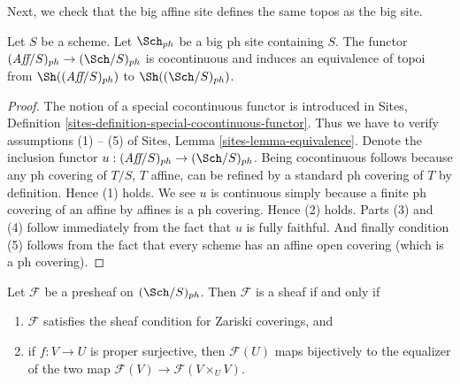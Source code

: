 \noindent
Next, we check that the big affine site defines the same
topos as the big site.

\begin{lemma}
\label{lemma-affine-big-site-ph}
Let $S$ be a scheme. Let $\Sch_{ph}$ be a big ph
site containing $S$.
The functor $(\textit{Aff}/S)_{ph} \to (\Sch/S)_{ph}$
is cocontinuous and induces an equivalence of topoi from
$\Sh((\textit{Aff}/S)_{ph})$ to
$\Sh((\Sch/S)_{ph})$.
\end{lemma}

\begin{proof}
The notion of a special cocontinuous functor is introduced in
Sites, Definition \ref{sites-definition-special-cocontinuous-functor}.
Thus we have to verify assumptions (1) -- (5) of
Sites, Lemma \ref{sites-lemma-equivalence}.
Denote the inclusion functor
$u : (\textit{Aff}/S)_{ph} \to (\Sch/S)_{ph}$.
Being cocontinuous follows because any ph covering of
$T/S$, $T$ affine, can be refined by a standard ph covering of $T$
by definition. Hence (1) holds. We see $u$ is continuous simply
because a finite ph covering of an affine by affines is a ph covering.
Hence (2) holds.
Parts (3) and (4) follow immediately from the fact that $u$ is
fully faithful. And finally condition (5) follows from the
fact that every scheme has an affine open covering (which is
a ph covering).
\end{proof}

\begin{lemma}
\label{lemma-characterize-sheaf}
Let $\mathcal{F}$ be a presheaf on $(\Sch/S)_{ph}$.
Then $\mathcal{F}$ is a sheaf if and only if
\begin{enumerate}
\item $\mathcal{F}$ satisfies the sheaf condition for
Zariski coverings, and
\item if $f : V \to U$ is proper surjective, then
$\mathcal{F}(U)$ maps bijectively to the equalizer
of the two map $\mathcal{F}(V) \to \mathcal{F}(V \times_U V)$.
\end{enumerate}
\end{lemma}

